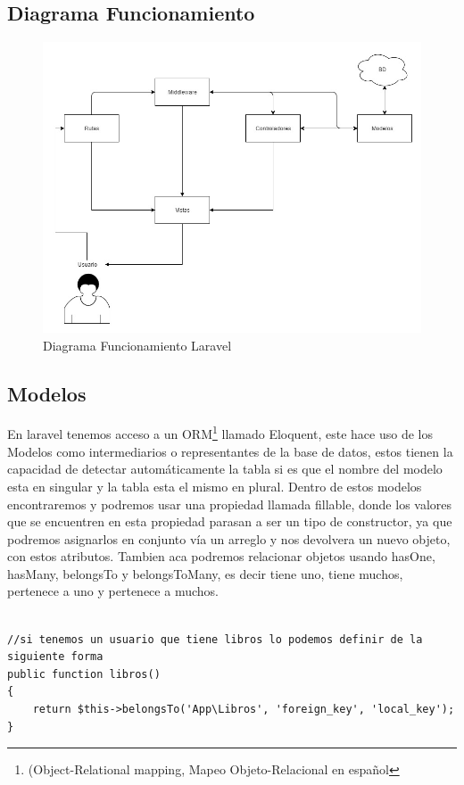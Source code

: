 \documentclass[spanish]{theme/pclreport}
\begin{document}
\subsection{Diagrama Funcionamiento}

\begin{figure}[H]
	\centering
	\includegraphics[scale=.4]{imagenes/diagrama.jpg}
	\caption{Diagrama Funcionamiento Laravel}
\end{figure}


\subsection{Modelos}
En laravel tenemos acceso a un ORM\footnote{(Object-Relational mapping, Mapeo Objeto-Relacional en español} llamado Eloquent, este hace uso de los Modelos como intermediarios o representantes de la base de datos, estos tienen la capacidad de detectar automáticamente la tabla si es que el nombre del modelo esta en singular y la tabla esta el mismo en plural. Dentro de estos modelos encontraremos y podremos usar una propiedad llamada fillable, donde los valores que se encuentren en esta propiedad parasan a ser un tipo de constructor, ya que podremos asignarlos en conjunto vía un arreglo y nos devolvera un nuevo objeto, con estos atributos. Tambien aca podremos relacionar objetos usando hasOne, hasMany, belongsTo y belongsToMany, es decir tiene uno, tiene muchos, pertenece a uno y pertenece a muchos. \newline

\begin{lstlisting}[caption={Ejemplo de Relaciones},captionpos=b]

//si tenemos un usuario que tiene libros lo podemos definir de la siguiente forma
public function libros()
{
    return $this->belongsTo('App\Libros', 'foreign_key', 'local_key');
}
\end{lstlisting}
\end{document}
